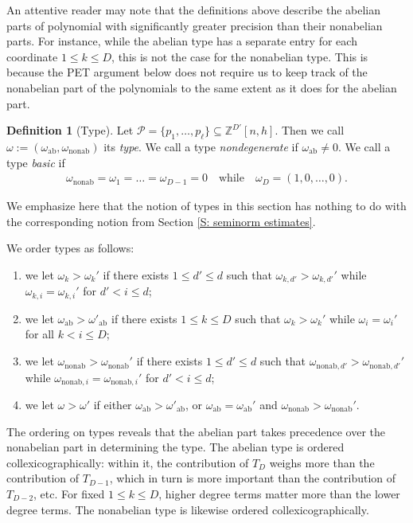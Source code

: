\documentclass[11pt]{amsart}
\theoremstyle{definition}
\newtheorem{definition}[lemma]{Definition}
\newcommand{\Z}{{\mathbb Z}}
\newcommand{\CP}{{\mathcal P}}
\newcommand{\1}{{\mathbf{1}}}
\newcommand{\ab}{{\mathrm{ab}}}
\newcommand{\nab}{{\mathrm{nonab}}}
\newcommand{\nonab}{{\mathrm{nonab}}}
\begin{document}
An attentive reader may note that the definitions above describe the abelian parts of polynomial with significantly greater precision than their nonabelian parts. For instance, while the abelian type has a separate entry for each coordinate $1\leq k\leq D$, this is not the case for the nonabelian type. This is because the PET argument below does not require us to keep track of the nonabelian part of the polynomials to the same extent as it does for the abelian part.

\begin{definition}[Type]
    Let $\CP = \{p_1, \ldots, p_\ell\}\subseteq\Z^{D'}[n,h]$. Then we call $\omega := (\omega_\ab, \omega_\nab)$ its \textit{type}. 
    We call a type \textit{nondegenerate} if $\omega_\ab \neq 0$.  We call a type \textit{basic} if
    \begin{align*}
        \omega_\nonab = \omega_{1}=\dots=\omega_{D-1}={0}\quad \textrm{while}\quad \omega_{D}=(1,0,\dots,0).
    \end{align*} 
\end{definition}

We emphasize here that the notion of types in this section has nothing to do with the corresponding notion from Section \ref{S: seminorm estimates}. 

We order types as follows:
\begin{enumerate}
    \item we let $\omega_{k}>\omega_{k}'$ if there exists $1\leq d'\leq d$ such that $\omega_{k,d'}>\omega_{k,d'}'$ while $\omega_{k,i} = \omega_{k,i}'$ for $d'<i\leq d$; 
        \item we let $\omega_\ab>\omega'_\ab$ if there exists $1\leq k\leq D$ such that $\omega_{k}>\omega_{k}'$ while $\omega_{i} =\omega_{i}'$ for all $k<i\leq D$;
    \item we let $\omega_{\nab}>\omega_{\nab}'$ if there exists $1\leq d'\leq d$ such that $\omega_{\nab,d'}>\omega_{\nab,d'}'$ while $\omega_{\nab,i} = \omega_{\nab,i}'$ for $d'<i\leq d$;
    \item we let $\omega > \omega'$ if either $\omega_\ab > \omega'_\ab$, or $\omega_\ab = \omega_\ab'$ and $\omega_\nab > \omega_\nab'$.
\end{enumerate}
 The ordering on types reveals that the abelian part takes precedence over the nonabelian part in determining the type. The abelian type is ordered collexicographically: within it, the contribution of $T_D$ weighs more than the contribution of $T_{D-1}$, which in turn is more important than the contribution of $T_{D-2}$, etc. For fixed $1\leq k\leq D$, higher degree terms matter more than the lower degree terms. The nonabelian type is likewise ordered collexicographically.
\end{document}
